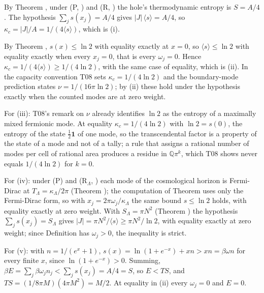 By Theorem , under (P, ) and (R, ) the hole's thermodynamic entropy is $S = A/4$. The hypothesis $\sum_{j} s(x_{j}) = A/4$ gives $|J|\,\langle s\rangle = A/4$, so $\kappa_{c} = |J|/A = 1/(4\langle s\rangle)$, which is (i).

By Theorem , $s(x) \le \ln 2$ with equality exactly at $x = 0$, so $\langle s\rangle \le \ln 2$ with equality exactly when every $x_{j} = 0$, that is every $\omega_{j} = 0$. Hence $\kappa_{c} = 1/(4\langle s\rangle) \ge 1/(4\ln 2)$, with the same case of equality, which is (ii). In the capacity convention T08 sets $\kappa_{c} = 1/(4\ln 2)$ and the boundary-mode prediction states $\nu = 1/(16\pi\ln 2)$; by (ii) these hold under the hypothesis exactly when the counted modes are at zero weight.

For (iii): T08's remark on $\nu$ already identifies $\ln 2$ as the entropy of a maximally mixed fermionic mode. At equality $\kappa_{c} = 1/(4\ln 2)$ with $\ln 2 = s(0)$, the entropy of the state $\tfrac12\mathbf 1$ of one mode, so the transcendental factor is a property of the state of a mode and not of a tally; a rule that assigns a rational number of modes per cell of rational area produces a residue in $\mathbb{Q}\pi^{k}$, which T08 shows never equals $1/(4\ln 2)$ for $k = 0$.

For (iv): under (P) and (R$_{\Lambda}$, ) each mode of the cosmological horizon is Fermi-Dirac at $T_{\Lambda} = \kappa_{\Lambda}/2\pi$ (Theorem ); the computation of Theorem  uses only the Fermi-Dirac form, so with $x_{j} = 2\pi\omega_{j}/\kappa_{\Lambda}$ the same bound $s \le \ln 2$ holds, with equality exactly at zero weight. With $S_{\Lambda} = \pi N^{2}$ (Theorem ) the hypothesis $\sum_{j} s(x_{j}) = S_{\Lambda}$ gives $|J| = \pi N^{2}/\langle s\rangle \ge \pi N^{2}/\ln 2$, with equality exactly at zero weight; since Definition  has $\omega_{j} > 0$, the inequality is strict.

For (v): with $n = 1/(e^{x} + 1)$, $s(x) = \ln(1 + e^{-x}) + xn > xn = \beta\omega n$ for every finite $x$, since $\ln(1 + e^{-x}) > 0$. Summing, $\beta E = \sum_{j}\beta\omega_{j}n_{j} < \sum_{j} s(x_{j}) = A/4 = S$, so $E < TS$, and $TS = (1/8\pi M)(4\pi M^{2}) = M/2$. At equality in (ii) every $\omega_{j} = 0$ and $E = 0$.

